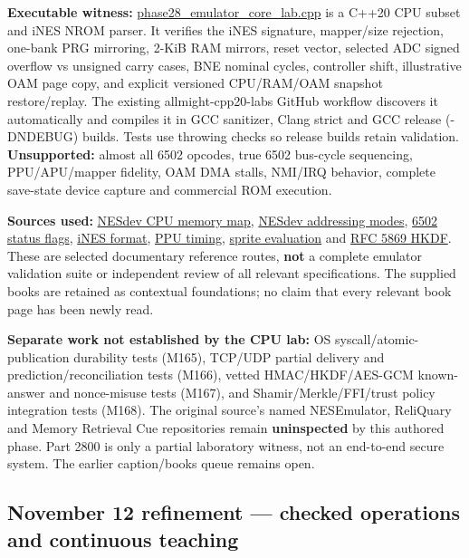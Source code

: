 \textbf{Executable witness:} \hyperref[source-file-552a9e2296dc984412c8f06d]{phase28\_emulator\_core\_lab.cpp} is a C++20 CPU subset and iNES NROM parser. It verifies the iNES signature, mapper/size rejection, one-bank PRG mirroring, 2-KiB RAM mirrors, reset vector, selected ADC signed overflow vs unsigned carry cases, BNE nominal cycles, controller shift, illustrative OAM page copy, and explicit versioned CPU/RAM/OAM snapshot restore/replay. The existing allmight-cpp20-labs GitHub workflow discovers it automatically and compiles it in GCC sanitizer, Clang strict and GCC release (-DNDEBUG) builds. Tests use throwing checks so release builds retain validation. \textbf{Unsupported:} almost all 6502 opcodes, true 6502 bus-cycle sequencing, PPU/APU/mapper fidelity, OAM DMA stalls, NMI/IRQ behavior, complete save-state device capture and commercial ROM execution.

\textbf{Sources used:} \href{https://www.nesdev.org/wiki/CPU_memory_map}{NESdev CPU memory map}, \href{https://www.nesdev.org/wiki/Addressing_modes}{NESdev addressing modes}, \href{https://www.nesdev.org/wiki/Status_flag}{6502 status flags}, \href{https://www.nesdev.org/wiki/INES}{iNES format}, \href{https://www.nesdev.org/wiki/PPU_frame_timing}{PPU timing}, \href{https://www.nesdev.org/wiki/PPU_sprite_evaluation}{sprite evaluation} and \href{https://www.rfc-editor.org/rfc/rfc5869.html}{RFC 5869 HKDF}. These are selected documentary reference routes, \textbf{not} a complete emulator validation suite or independent review of all relevant specifications. The supplied books are retained as contextual foundations; no claim that every relevant book page has been newly read.

\textbf{Separate work not established by the CPU lab:} OS syscall/atomic-publication durability tests (M165), TCP/UDP partial delivery and prediction/reconciliation tests (M166), vetted HMAC/HKDF/AES-GCM known-answer and nonce-misuse tests (M167), and Shamir/Merkle/FFI/trust policy integration tests (M168). The original source's named NESEmulator, ReliQuary and Memory Retrieval Cue repositories remain \textbf{uninspected} by this authored phase. Part 2800 is only a partial laboratory witness, not an end-to-end secure system. The earlier caption/books queue remains open.

\subsection{November 12 refinement --- checked operations and continuous teaching}\label{appendix-a103e7846d21-november-12-refinement-checked-operations-and-continuous-teaching}

